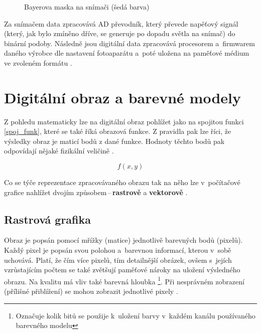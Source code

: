 \begin{figure}[ht]
\begin{center}
\caption{Bayerova maska na snímači (šedá barva) \cite{maska_barva}}
\label{filtry}
\end{center}
\end{figure}

Za snímačem data zpracovává AD převodník, který převede napěťový signál (který, jak bylo zmíněno dříve, se generuje po dopadu světla na snímač) do binární podoby. Následně jsou digitální data zpracovává procesorem a~firmwarem daného výrobce dle nastavení fotoaparátu a~poté uložena na paměťové médium ve zvoleném formátu \cite{digi_foto_book}.

\section{Digitální obraz a barevné modely}
Z pohledu matematicky lze na digitální obraz pohlížet jako na spojitou funkci \ref{spoj_funk}, které se také říká obrazová funkce. Z pravidla pak lze říci, že výsledky obraz je maticí bodů z dané funkce. Hodnoty těchto bodů pak odpovídají nějaké fizikální veličině \cite{obraz_mat}.

\begin{equation}
\label{spoj_funk}
f(x,y)
\end{equation} 

Co se týče reprezentace zpracovávaného obrazu tak na něho lze v~počítačové grafice nahlížet dvojím způsobem\,--\,\textbf{rastrově} a \textbf{vektorově} \cite{IZG_opora}.

\subsection*{Rastrová grafika}
Obraz je popsán pomocí mřížky (matice) jednotlivě barevných bodů (pixelů). Každý pixel je popsán svou polohou a~barevnou informací, kterou v~sobě uchovává. Platí, že čím více pixelů, tím detailnější obrázek, ovšem s~jejích vzrůstajícím počtem se také zvětšují paměťové nároky na uložení výsledného obrazu. Na kvalitu má vliv také barevná hloubka \footnote{Označuje kolik bitů se použije k~uložení barvy v~každém kanálu používaného barevného modelu}. Při nesprávném zobrazení (přílišné přiblížení) se mohou zobrazit jednotlivé pixely \cite{rastr_vektr}.

